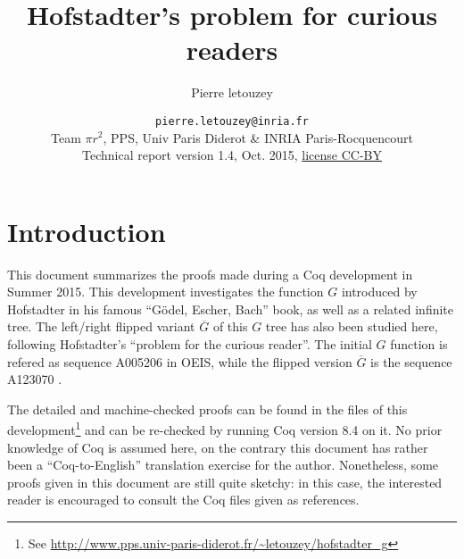 \documentclass[a4paper,11pt]{article}
\title{Hofstadter's problem for curious readers}
\author{Pierre letouzey}
\date{\small
{\tt pierre.letouzey@inria.fr}\\
Team $\pi r^2$, PPS, Univ Paris Diderot \& INRIA Paris-Rocquencourt\\
Technical report version 1.4, Oct. 2015, \href{http://creativecommons.org/licenses/by/4.0/}{license CC-BY}
}
\begin{document}
\newtheorem{theorem}{Theorem}
\newtheorem{definition}{Definition}
\maketitle


\newcommand{\docgen}[2]{\href{http://www.pps.univ-paris-diderot.fr/~letouzey/hofstadter_g/doc/#1.html#2}{\tt #1.v}}
\newcommand{\doc}[1]{\docgen{#1}{}}
\newcommand{\doclab}[2]{\docgen{#1}{\##2}}
\newcommand{\FG}{\ensuremath{\overline{G}}}
\newcommand{\fibrest}{\ensuremath{\Sigma F_i}}

\section{Introduction}
This document summarizes the proofs made during a Coq development in
Summer 2015. This development investigates the function $G$ introduced
by Hofstadter in his famous ``Gödel, Escher, Bach'' book\cite{GEB},
as well as a related infinite tree. The left/right flipped variant
$\FG$ of this $G$ tree has also been studied here, following
Hofstadter's ``problem for the curious reader''.
The initial $G$ function is refered as sequence A005206 in
OEIS\cite{OEIS-G}, while the flipped version $\FG$ is the sequence
A123070 \cite{OEIS-FG}.

The detailed and machine-checked proofs can be found in the files
of this development\footnote{See
\url{http://www.pps.univ-paris-diderot.fr/~letouzey/hofstadter_g}}
and can be re-checked by running Coq \cite{Coq} version 8.4 on it.
No prior knowledge of Coq is assumed here, on the contrary this
document has rather been a ``Coq-to-English'' translation
exercise for the author. Nonetheless, some proofs given in this
document are still quite sketchy: in this case, the interested
reader is encouraged to consult the Coq files given as references.
\end{document}
